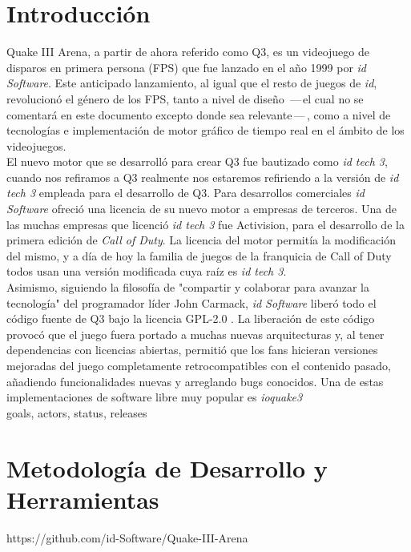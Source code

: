 \documentclass[a4paper,12pt]{report}
\begin{document}
	
	\tableofcontents
	\clearpage
	
	
	\section{Introducción}
	Quake III Arena, a partir de ahora referido como Q3, es un videojuego de disparos en primera persona (FPS) que fue lanzado en el año 1999 por \textit{id Software}. Este anticipado lanzamiento, al igual que el resto de juegos de \textit{id}, revolucionó el género de los FPS, tanto a nivel de diseño \,---\,el cual no se comentará en este documento excepto donde sea relevante\,---\,, como a nivel de tecnologías e implementación de motor gráfico de tiempo real en el ámbito de los videojuegos. \cite{quake3}\\
	
	El nuevo motor que se desarrolló para crear Q3 fue bautizado como \textit{id tech 3}, cuando nos refiramos a Q3 realmente nos estaremos refiriendo a la versión de \textit{id tech 3} empleada para el desarrollo de Q3. Para desarrollos comerciales \textit{id Software} ofreció una licencia de su nuevo motor a empresas de terceros. Una de las muchas empresas que licenció \textit{id tech 3} fue Activision, para el desarrollo de la primera edición de \textit{Call of Duty}. La licencia del motor permitía la modificación del mismo, y a día de hoy la familia de juegos de la franquicia de Call of Duty todos usan una versión modificada cuya raíz es \textit{id tech 3}. \cite{idtech3}\\
	
	Asimismo, siguiendo la filosofía de "compartir y colaborar para avanzar la tecnología" del programador líder John Carmack, \textit{id Software} liberó todo el código fuente de Q3 bajo la licencia GPL-2.0 \cite{sourcecode}. La liberación de este código provocó que el juego fuera portado a muchas nuevas arquitecturas y, al tener dependencias con licencias abiertas, permitió que los fans hicieran versiones mejoradas del juego completamente retrocompatibles con el contenido pasado, añadiendo funcionalidades nuevas y arreglando bugs conocidos. Una de estas implementaciones de software libre muy popular es \textit{ioquake3} \cite{ioquake3} \\
	
	goals, actors, status, releases \cite{example}\\
	
	\section{Metodología de Desarrollo y Herramientas}
	https://github.com/id-Software/Quake-III-Arena\\
	
\end{document}
